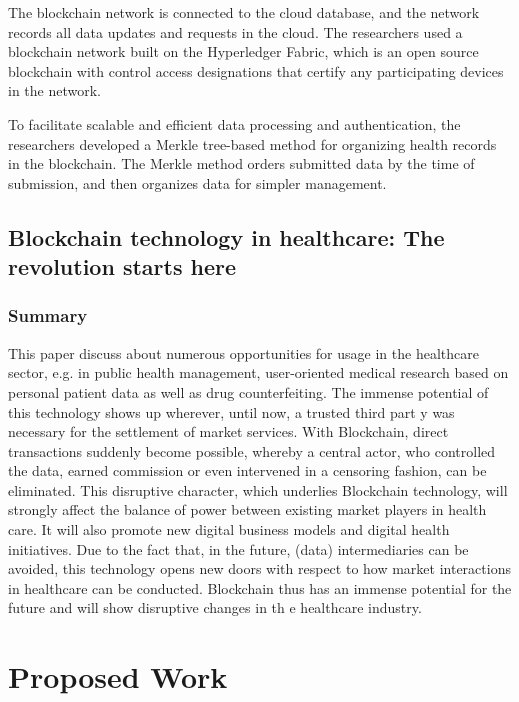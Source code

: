 \documentclass[11pt]{report}
\begin{document}
The blockchain network is connected to the cloud database, and the network records all data updates and requests in the cloud. The researchers used a blockchain network built on the Hyperledger Fabric, which is an open source blockchain with control access designations that certify any participating devices in the network.

To facilitate scalable and efficient data processing and authentication, the researchers developed a Merkle tree-based method for organizing health records in the blockchain. The Merkle method orders submitted data by the time of submission, and then organizes data for simpler management.


\section{Blockchain technology in healthcare: The revolution starts here\cite{7}}
\subsection{Summary}
This paper discuss about
numerous opportunities for usage in the healthcare sector, e.g. 
in  public  health  management,  user-oriented  medical  research  
based on personal patient data as well as drug counterfeiting.  
The   immense   potential   of   this   technology   shows   up   
wherever,  until  now,  a  trusted  third  part
y  was  necessary  for  the  settlement  of  market  services.  With  Blockchain,  direct  
transactions  suddenly  become
  possible,  whereby  a  central  
actor,  who  controlled  the  data,  earned  commission  or  even  
intervened in a censoring fashion, can be eliminated. 
This    disruptive    character,    which    underlies    Blockchain    
technology,  will  strongly  affect  
the  balance  of  power  between  
existing market players in health
care. It will also promote new 
digital business models and digital health initiatives. Due to the 
fact  that,  in  the  future,  (data)  intermediaries  can  be  avoided,  
this  technology  opens  new  doors  with  respect  to  how  market  
interactions  in  healthcare  can  
be  conducted.  Blockchain  thus  
has   an   immense   potential   for   the   future   and   will   show   
disruptive changes in th
e healthcare industry. 

\chapter {Proposed Work} 
\end{document}
